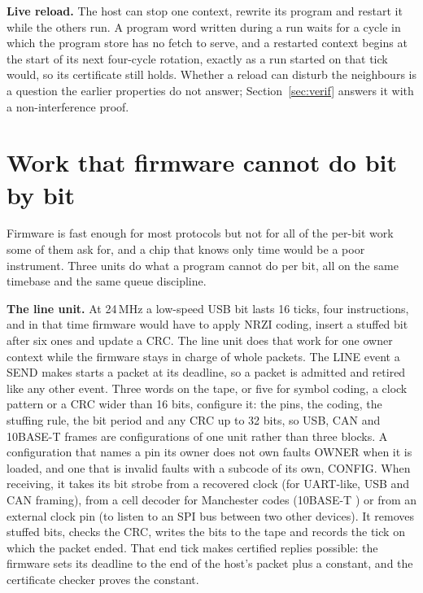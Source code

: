 \documentclass[conference,letterpaper]{IEEEtran}
\begin{document}
\textbf{Live reload.} The host can stop one context, rewrite its program and restart it
while the others run. A program word written during a run waits for a cycle in which the
program store has no fetch to serve, and a restarted context begins at the start of its
next four-cycle rotation, exactly as a run started on that tick would, so its certificate
still holds. Whether a
reload can disturb the neighbours is a question the earlier properties do not answer;
Section~\ref{sec:verif} answers it with a non-interference proof.

\section{Work that firmware cannot do bit by bit}
\label{sec:units}

Firmware is fast enough for most protocols but not for all of the per-bit work some of
them ask for, and a chip that knows only time would be a poor instrument. Three units do
what a program cannot do per bit, all on the same timebase and the same queue
discipline.

\textbf{The line unit.} At 24\,MHz a low-speed USB bit lasts 16 ticks, four instructions,
and in that time firmware would have to apply NRZI coding, insert a stuffed bit after six
ones and update a CRC. The line unit does that work for one owner context while the
firmware stays in charge of whole packets. The LINE event a SEND makes starts a packet at its deadline,
so a packet is admitted and retired like any other event. Three words on the tape,
or five for symbol coding, a clock pattern or a CRC wider than 16 bits, configure it: the pins, the coding, the stuffing rule, the bit period and any CRC up to
32 bits, so USB, CAN and 10BASE-T frames are configurations of one unit rather than
three blocks. A configuration that names a pin its owner does not own faults OWNER when
it is loaded, and one that is invalid faults with a subcode of its own, CONFIG. When receiving, it takes its bit strobe from a recovered clock (for
UART-like, USB and CAN framing), from a cell decoder for Manchester codes (10BASE-T
\cite{ieee8023}) or from an external clock pin (to listen to an SPI bus between two other
devices). It removes stuffed bits, checks the CRC, writes the bits to the tape and
records the tick on which the packet ended. That end tick makes certified replies
possible: the firmware sets its deadline to the end of the host's packet plus a constant,
and the certificate checker proves the constant.
\end{document}
